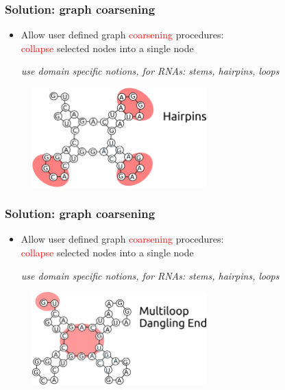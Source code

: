 \documentclass{beamer}
\newcommand{\red}[1]{\textcolor{red}{#1}}
\begin{document}
\begin{frame}
    \frametitle{Solution: graph coarsening}
    \begin{itemize}
        \item Allow user defined graph \red{coarsening} procedures:\\
        \red{collapse} selected nodes into a single node \\
        \begin{small}{\em use domain specific notions, for RNAs: stems, hairpins, loops}\end{small}
   \end{itemize}
   \begin{figure}[ht]
        \centering
        \includegraphics[width=0.6\textwidth]{images/Hairpins.png}
    \end{figure}
\end{frame}

\begin{frame}
    \frametitle{Solution: graph coarsening}
    \begin{itemize}
        \item Allow user defined graph \red{coarsening} procedures:\\
        \red{collapse} selected nodes into a single node \\
        \begin{small}{\em use domain specific notions, for RNAs: stems, hairpins, loops}\end{small}
   \end{itemize}
   \begin{figure}[ht]
        \centering
        \includegraphics[width=0.6\textwidth]{images/multiloop.png}
    \end{figure}
\end{frame}
\end{document}
